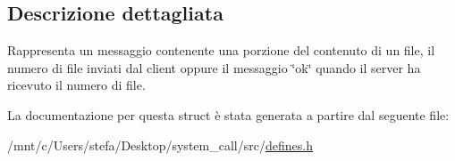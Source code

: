 \subsection{Descrizione dettagliata}
Rappresenta un messaggio contenente una porzione del contenuto di un file, il numero di file inviati dal client oppure il messaggio \char`\"{}ok\char`\"{} quando il server ha ricevuto il numero di file. 

La documentazione per questa struct è stata generata a partire dal seguente file\+:\begin{DoxyCompactItemize}
\item 
/mnt/c/\+Users/stefa/\+Desktop/system\+\_\+call/src/\hyperlink{defines_8h}{defines.\+h}\end{DoxyCompactItemize}
